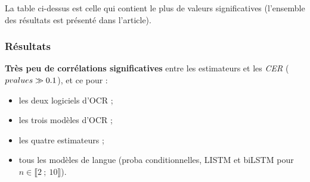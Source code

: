 \documentclass{beamer}
\begin{document}
\begin{frame}
	    La table ci-dessus est celle qui contient le plus de valeurs significatives (l'ensemble des résultats est présenté dans l'article). 

		\end{frame}

		\begin{frame}\frametitle{Résultats}

			\textbf{Très peu de corrélations significatives} entre les estimateurs et les \textit{CER} ($p\-values \gg 0.1$), et ce pour :
			\begin{itemize}
				\item les deux logiciels d'OCR ;
				\item les trois modèles d'OCR ;
				\item les quatre estimateurs ;
				\item tous les modèles de langue (proba conditionnelles, LISTM et biLSTM pour $n \in \llbracket 2~;~ 10 \rrbracket$).
			\end{itemize}
		\end{frame}
\end{document}
